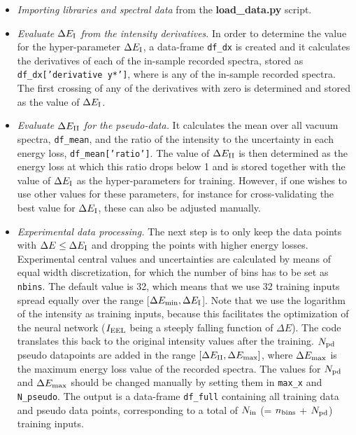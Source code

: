 \begin{itemize}
  
\item {\it Importing libraries and spectral data} from the {\bf load\_data.py} script.

\item {\it Evaluate  $\Delta E_{\rm I}$ from the intensity derivatives}.
  In order to determine the value for the hyper-parameter
  $\Delta E_{\rm I}$, a data-frame {\tt df\_dx} is created
and it calculates the derivatives of each of the in-sample recorded spectra, 
stored as {\tt df\_dx['derivative y*']}, where {\tt *} is any of the in-sample recorded spectra.
%
The first crossing of any of the derivatives with zero is determined 
and stored as the value of $\Delta E_{\rm I}$. 

\item {\it Evaluate $\Delta E_{\rm II}$ for the pseudo-data.}
It calculates the mean over all vacuum spectra, {\tt df\_mean}, and the ratio of the 
intensity to the uncertainty in each energy loss, {\tt df\_mean['ratio']}. 
%
The value of $\Delta E_{\rm II}$ is then determined as the energy loss at which this ratio
drops below 1 and  is stored together with the value of $\Delta E_{\rm I}$
as the hyper-parameters for training. 
%
However, if one wishes to use other values for these parameters, for instance for 
cross-validating the best value for $\Delta E_{\rm I}$, these can also be adjusted manually.

\item {\it Experimental data processing.}
%
  The next step is to only keep the data points with $\Delta E \le \Delta E_{\rm I}$  
and dropping the points with higher energy losses.
%
Experimental central values and uncertainties are calculated by means of equal width 
discretization, for which the number of bins has to be set as {\tt nbins}. 
%
The default value is 32, which means that we use 32 training inputs spread equally
over the range [$ \Delta E_{\rm min}, \Delta E_{\rm I}$]. 
%
Note that we use the logarithm of the intensity as training inputs, because this facilitates
the optimization of the neural network ($I_{\rm EEL}$ being a steeply falling function
of $\Delta E$).
%
The code translates this back to the original intensity values after the training.
%
$N_{\rm pd}$
pseudo datapoints are added in the range $[\Delta E_{\rm II}, \Delta E_{\rm max}]$, where
$ \Delta E_{\rm max}$
is the maximum energy loss value of the recorded spectra. 
%
The values for $N_{\rm pd}$ and $\Delta E_{\rm max}$ should be changed manually by 
setting them in {\tt max\_x} and {\tt N\_pseudo}. 
%
The output is a data-frame {\tt df\_full} containing all training data and pseudo data points, 
corresponding to a total of $N_{\rm in}$ (= $n_{\rm bins}$ + $N_{\rm pd}$) training inputs.


\end{itemize}
